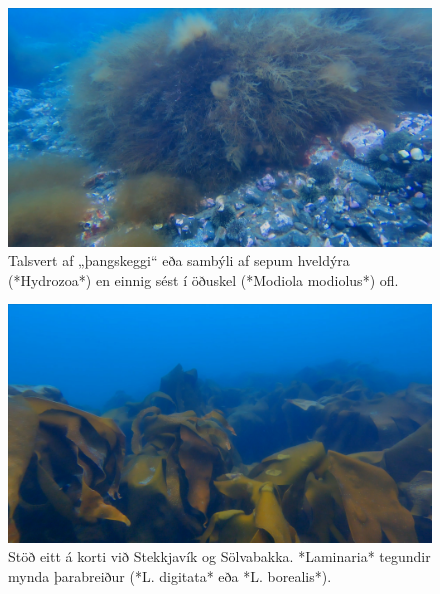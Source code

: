 \documentclass[icelandic,]{book}
\begin{document}
\begin{figure}

{\centering \includegraphics[width=1\linewidth]{skjol/skogar/sk2/stodvar/st1/sk2-st1} 

}

\caption{Talsvert af „þangskeggi“ eða sambýli af sepum hveldýra (*Hydrozoa*) en einnig sést í öðuskel (*Modiola modiolus*) ofl. }\label{fig:mynd-sk-tvo-stod-eitt}
\end{figure}

\begin{figure}

{\centering \includegraphics[width=1\linewidth]{skjol/skogar/sk2/stodvar/st1/sk2-st1B} 

}

\caption{Stöð eitt á korti við Stekkjavík og Sölvabakka. *Laminaria* tegundir mynda þarabreiður (*L. digitata* eða *L. borealis*). }\label{fig:mynd-sk-tvo-stod-eittB}
\end{figure}
\end{document}
